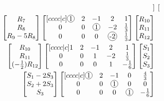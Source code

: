 \documentclass{report}
\newcommand*\circled[1]{\tikz[baseline=(char.base)]{
            \node[shape=circle,draw,inner sep=0.8pt] (char) {#1};}}
\begin{document}
\begin{align*}
\begin{bmatrix}
\end{bmatrix}\\
\begin{bmatrix}
R_7\\
R_8\\
R_9 - 5R_8\\
\end{bmatrix}
\begin{bmatrix}[cccc|c]
\circled{1} & 2 & -1 & 2 & 1\\
0 & 0 & \circled{1} & -2 & \frac{1}{3}\\
0 & 0 & 0 & \circled{-2} & \frac{1}{3}\\
\end{bmatrix}
\begin{bmatrix}
R_{10}\\ R_{11}\\ R_{12}\\
\end{bmatrix}\\
\begin{bmatrix}
R_{10}\\
R_{11}\\
(-\frac{1}{2})R_{12}\\
\end{bmatrix}
\begin{bmatrix}[cccc|c]
1 & 2 & -1 & 2 & 1\\
0 & 0 & 1 & -2 & \frac{1}{3}\\
0 & 0 & 0 & 1 & -\frac{1}{6}\\
\end{bmatrix}
\begin{bmatrix}
S_1\\ S_2\\ S_3\\
\end{bmatrix}\\
\begin{bmatrix}
S_1 - 2S_3\\
S_2 + 2S_3\\
S_3\\
\end{bmatrix}
\begin{bmatrix}[cccc|c]
\circled{1} & 2 & -1 & 0 & \frac{4}{3}\\
0 & 0 & \circled{1} & 0 & 0\\
0 & 0 & 0 & \circled{1} & -\frac{1}{6}\\
\end{bmatrix}

\end{align*}
\end{document}
